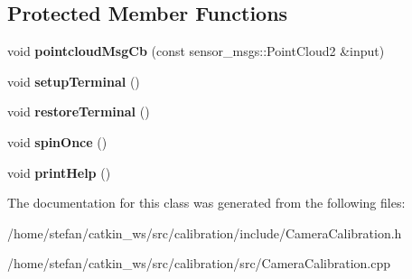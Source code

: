 \subsection*{\-Protected \-Member \-Functions}
\begin{DoxyCompactItemize}
\item 
\hypertarget{classCameraCalibration_a73d0baadef762436150174cadb27a5aa}{void {\bfseries pointcloud\-Msg\-Cb} (const sensor\-\_\-msgs\-::\-Point\-Cloud2 \&input)}\label{classCameraCalibration_a73d0baadef762436150174cadb27a5aa}

\item 
\hypertarget{classCameraCalibration_aeaae564e9b82a15efe553efb6ba627a6}{void {\bfseries setup\-Terminal} ()}\label{classCameraCalibration_aeaae564e9b82a15efe553efb6ba627a6}

\item 
\hypertarget{classCameraCalibration_a2b4033f9d559a82cee68237c0b8c2bd7}{void {\bfseries restore\-Terminal} ()}\label{classCameraCalibration_a2b4033f9d559a82cee68237c0b8c2bd7}

\item 
\hypertarget{classCameraCalibration_ae351fadc3fec0f192685100374a5558d}{void {\bfseries spin\-Once} ()}\label{classCameraCalibration_ae351fadc3fec0f192685100374a5558d}

\item 
\hypertarget{classCameraCalibration_a2a687bb66def89d06def28abb889ce40}{void {\bfseries print\-Help} ()}\label{classCameraCalibration_a2a687bb66def89d06def28abb889ce40}

\end{DoxyCompactItemize}


\-The documentation for this class was generated from the following files\-:\begin{DoxyCompactItemize}
\item 
/home/stefan/catkin\-\_\-ws/src/calibration/include/\-Camera\-Calibration.\-h\item 
/home/stefan/catkin\-\_\-ws/src/calibration/src/\-Camera\-Calibration.\-cpp\end{DoxyCompactItemize}
